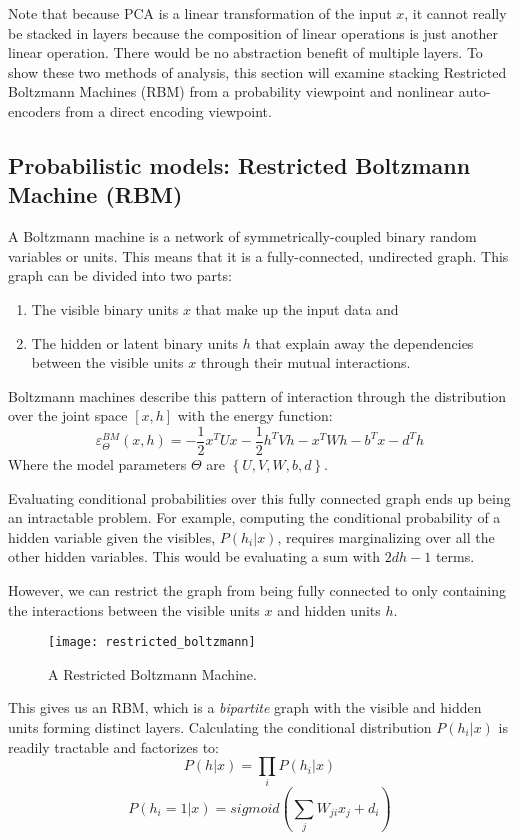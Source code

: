 Note that because PCA is a linear transformation of the input \(x\), it cannot really be stacked in layers because the composition of linear operations is just another linear operation. There would be no abstraction benefit of multiple layers. To show these two methods of analysis, this section will examine stacking Restricted Boltzmann Machines (RBM) from a probability viewpoint and nonlinear auto-encoders from a direct encoding viewpoint.

\subsection{Probabilistic models: Restricted Boltzmann Machine (RBM)}
A Boltzmann machine is a network of symmetrically-coupled binary random variables or units. This means that it is a fully-connected, undirected graph. This graph can be divided into two parts:

\begin{enumerate}
\item The visible binary units \(x\) that make up the input data and
\item The hidden or latent binary units \(h\) that explain away the dependencies between the visible units \(x\) through their mutual interactions.
\end{enumerate}

Boltzmann machines describe this pattern of interaction through the distribution over the joint space \([x,h]\) with the energy function: 
\[\varepsilon_\Theta^{BM} (x,h) = -\frac{1}{2} x^T Ux - \frac{1}{2} h^T Vh - x^T Wh - b^T x - d^T h\]
Where the model parameters \(\Theta\) are \(\left\{U,V,W,b,d\right\}\).

Evaluating conditional probabilities over this fully connected graph ends up being an intractable problem. For example, computing the conditional probability of a hidden variable given the visibles, \(P(h_i | x)\), requires marginalizing over all the other hidden variables. This would be evaluating a sum with \(2dh - 1\) terms.

However, we can restrict the graph from being fully connected to only containing the interactions between the visible units \(x\) and hidden units \(h\). 

\begin{figure}[h!]
  \centering
    \texttt{[image: restricted\_boltzmann]}
\caption{A Restricted Boltzmann Machine.}
\end{figure}

This gives us an RBM, which is a \emph{bipartite} graph with the visible and hidden units forming distinct layers. Calculating the conditional distribution \(P(h_i | x)\) is readily tractable and factorizes to: 
\[P(h | x) = \prod_i P(h_i | x)\]
\[P(h_i = 1 | x) = sigmoid \left( \sum_j W_{ji} x_j + d_i \right)\]

